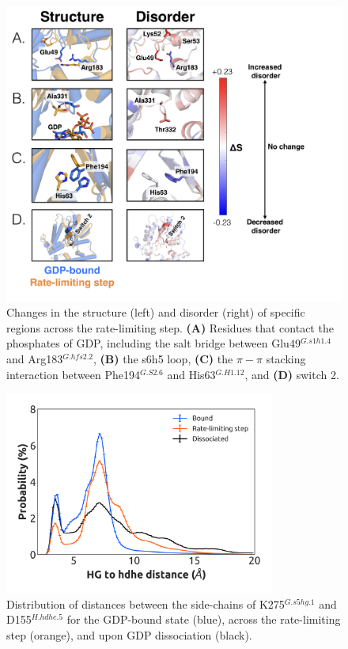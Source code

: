 \documentclass[../main.tex]{subfiles}
\begin{document}
    \begin{figure}[!htb] %
        \centering
        \includegraphics[width=5.5in]{ch4-fig2-supp3.png}
        \caption[Changes in the structure (left) and disorder (right) of specific regions across the rate-limiting step.]
            {Changes in the structure (left) and disorder (right) of specific regions across the rate-limiting step. \textbf{(A)} Residues that contact the phosphates of GDP, including the salt bridge between Glu49$^{G.s1h1.4}$ and Arg183$^{G.hfs2.2}$, \textbf{(B)} the s6h5 loop, \textbf{(C)} the $\pi - \pi$ stacking interaction between Phe194$^{G.S2.6}$ and His63$^{G.H1.12}$, and \textbf{(D)} switch 2.}
        \label{fig:ch4-fig2-supp3}
    \end{figure}

    \begin{figure}[!htb] %
        \centering
        \includegraphics[width=3.5in]{ch4-fig2-supp4.png}
        \caption[Distribution of distances between the side-chains of K275$^{G.s5hg.1}$ and D155$^{H.hdhe.5}$ for the GDP-bound state (blue), across the rate-limiting step (orange), and upon GDP dissociation (black).]
            {Distribution of distances between the side-chains of K275$^{G.s5hg.1}$ and D155$^{H.hdhe.5}$ for the GDP-bound state (blue), across the rate-limiting step (orange), and upon GDP dissociation (black).}
        \label{fig:ch4-fig2-supp4}
    \end{figure}
\end{document}
